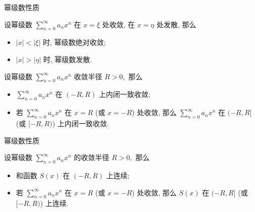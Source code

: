 \begin{frame}{幂级数性质}

\begin{thm}
设幂级数 $\sum\limits_{n=0}^\infty a_n x^n$ 在 $x = \xi$ 处收敛, 在 $x = \eta$ 处发散, 那么
\begin{itemize}
\item $\lvert x \rvert < \lvert \xi \rvert$ 时, 幂级数绝对收敛;
\item $\lvert x \rvert > \lvert \eta \rvert$ 时, 幂级数发散.
\end{itemize}
\end{thm}

\pause

\begin{thm}
设幂级数 $\sum\limits_{n=0}^\infty a_n x^n$ 收敛半径 $R > 0,$ 那么
\begin{itemize}
\item $\sum\limits_{n=0}^\infty a_n x^n$ 在 $(-R, R)$ 上内闭一致收敛;
\item 若 $\sum\limits_{n=0}^\infty a_n x^n$ 在 $x = R$ (或 $x = -R$) 处收敛, 那么 $\sum\limits_{n=0}^\infty a_n x^n$ 在 $(-R, R]$ (或 $[-R, R)$) 上内闭一致收敛.
\end{itemize}
\end{thm}

\end{frame}


\begin{frame}{幂级数性质}

\begin{thm}[和函数的连续性]
设幂级数 $\sum\limits_{n=0}^\infty a_n x^n$ 的收敛半径 $R > 0,$ 那么
\begin{itemize}
\item 和函数 $S(x)$ 在 $(-R, R)$ 上连续;
\item 若 $\sum\limits_{n=0}^\infty a_n x^n$ 在 $x = R$ (或 $x = -R$) 处收敛, 那么 $S(x)$ 在 $(-R, R]$ (或 $[-R, R)$) 上连续.
\end{itemize}
\end{thm}

\end{frame}


